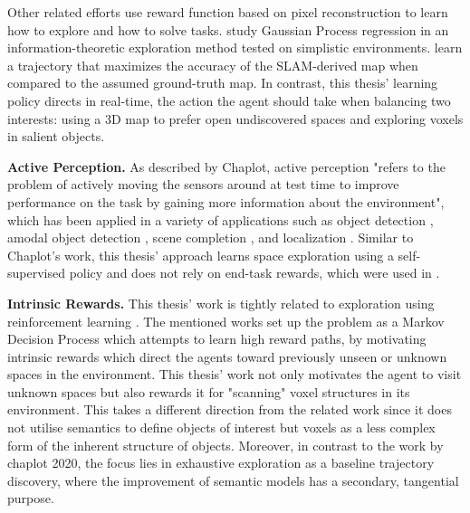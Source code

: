 Other related efforts use 
\cite{jayaraman2018learning} reward function based on pixel reconstruction to learn how to explore and how to solve tasks. 
\textcite{bai2016information} study Gaussian Process regression in an information-theoretic exploration method tested on simplistic environments.
\textcite{kollar2008trajectory} learn a trajectory that maximizes the accuracy of the SLAM-derived map when compared to the assumed ground-truth map.
In contrast, this thesis' learning policy directs in real-time, the action the agent should take when balancing two interests: using a 3D map to prefer open undiscovered spaces and exploring voxels in salient objects. 


\textbf{Active Perception.} %
As described by Chaplot, active perception \cite{bajcsy1988active} "refers to the problem of actively moving the sensors around at test time to improve performance on the task by
gaining more information about the environment", which has been applied in a variety of applications such as object detection \cite{ammirato2017dataset}, amodal object detection \cite{yang2019embodied}, scene completion
\cite{jayaraman2018learning}, and localization \cite{chaplot2018active, fox1998active}. 
Similar to Chaplot's work, this thesis' approach learns space exploration using a self-supervised policy and does not rely on end-task rewards, which were used in \cite{chaplot2018active, jayaraman2018learning, yang2019embodied}.

\textbf{Intrinsic Rewards.} %
This thesis' work is tightly related to exploration using reinforcement learning \cite{auer2002using, jaksch2010near, schmidhuber1991possibility, sutton2018reinforcement}. 
The mentioned works set up the problem as a Markov Decision Process which attempts to learn high reward paths, by motivating intrinsic rewards which direct the agents toward previously unseen \cite{eysenbach2018diversity} or unknown spaces \cite{pathak2017curiosity} in the environment. This thesis' work not only motivates the agent to visit unknown spaces but also rewards it for "scanning" voxel structures in its environment. This takes a different direction from the related work since it does not utilise semantics to define objects of interest but voxels as a less complex form of the inherent structure of objects. Moreover, in contrast to the work by chaplot 2020, the focus lies in exhaustive exploration as a baseline trajectory discovery, where the improvement of semantic models has a secondary, tangential purpose. 

